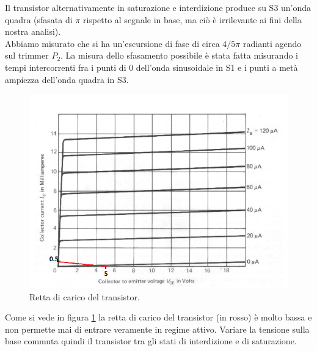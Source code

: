 \documentclass[10pt,a4paper]{article}
\begin{document}
Il transistor alternativamente in saturazione e interdizione produce su S3 un'onda quadra (sfasata di $\pi$ rispetto al segnale in base, ma ciò è irrilevante ai fini della nostra analisi).\\
Abbiamo misurato che si ha un'escursione di fase di circa $4/5 \pi$ radianti agendo sul trimmer $P_2$. La misura dello sfasamento possibile è stata fatta misurando i tempi intercorrenti fra i punti di 0 dell'onda sinusoidale in S1 e i punti a metà ampiezza  dell'onda quadra in S3.\\


\begin{figure}[!htb]
  \centering
  \includegraphics[scale=0.6]{transistorbjt.png}
\caption{Retta di carico del transistor.\label{fig:transistor}}
\end{figure}

Come si vede in figura \ref{fig:transistor} la retta di carico del transistor (in rosso) è molto bassa e non permette mai di entrare veramente in regime attivo. Variare la tensione sulla base commuta quindi il transistor tra gli stati di interdizione e di saturazione.\\

\end{document}
